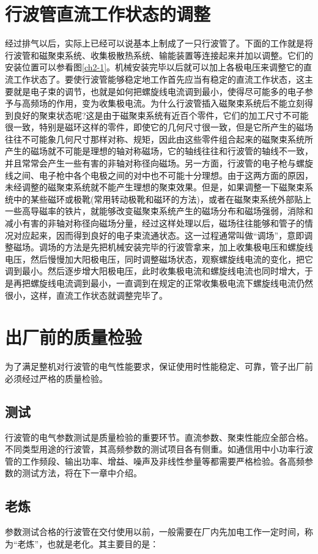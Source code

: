 \section{行波管直流工作状态的调整}
经过排气以后，实际上已经可以说基本上制成了一只行波管了。下面的工作就是将行波管和磁聚束系统、收集极散热系统、输能装置等连接起来并加以调整。它们的安装位置可以参看图\ref{ch2-1}。机械安装完毕以后就可以加上各极电压来调整它的直流工作状态了。要使行波管能够稳定地工作首先应当有稳定的直流工作状态，这主要就是电子束的调节，也就是如何把螺旋线电流调到最小，使得尽可能多的电子参予与高频场的作用，变为收集极电流。为什么行波管插入磁聚束系统后不能立刻得到良好的聚束状态呢?这是由于磁聚束系统有近百个零件，它们的加工尺寸不可能很一致，特别是磁环这样的零件，即使它的几何尺寸很一致，但是它所产生的磁场往往不可能象几何尺寸那样对称、规矩，因此由这些零件组合起来的磁聚束系统所产生的磁场就不可能是理想的轴对称磁场，它的轴线往往和行波管的轴线不一致，并且常常会产生一些有害的非轴对称径向磁场。另一方面，行波管的电子枪与螺旋线之间、电子枪中各个电极之间的对中也不可能十分理想。由于这两方面的原因，未经调整的磁聚束系统就不能产生理想的聚束效果。但是，如果调整一下磁聚束系统中的某些磁环或极靴(常用转动极靴和磁环的方法)，或者在磁聚束系统外部贴上一些高导磁率的铁片，就能够改变磁聚束系统产生的磁场分布和磁场强弱，消除和减小有害的非轴对称径向磁场分量，经过这样处理以后，磁场往往能够和管子的情况对应起来，因而得到良好的电子束流通状态。这一过程通常叫做“调场”，意即调整磁场。调场的方法是先把机械安装完毕的行波管拿来，加上收集极电压和螺旋线电压，然后慢慢加大阳极电压，同时调整磁场状态，观察螺旋线电流的变化，把它调到最小。然后逐步增大阳极电压，此时收集极电流和螺旋线电流也同时增大，于是再把螺旋线电流调到最小，一直调到在规定的正常收集极电流下螺旋线电流仍然很小，这样，直流工作状态就调整完毕了。
\section{出厂前的质量检验}
为了满足整机对行波管的电气性能要求，保证使用时性能稳定、可靠，管子出厂前必须经过严格的质量检验。

\subsection{测试}
行波管的电气参数测试是质量检验的重要环节。直流参数、聚束性能应全部合格。不同类型用途的行波管，其高频参数的测试项目各有侧重。如通信用中小功率行波管的工作频段、输出功率、增益、噪声及非线性参量等都需要严格检验。各高频参数的测试方法，将在下一章中介绍。

\subsection{老炼}
参数测试合格的行波管在交付使用以前，一般需要在厂内先加电工作一定时间，称为“老炼”，也就是老化。其主要目的是：

